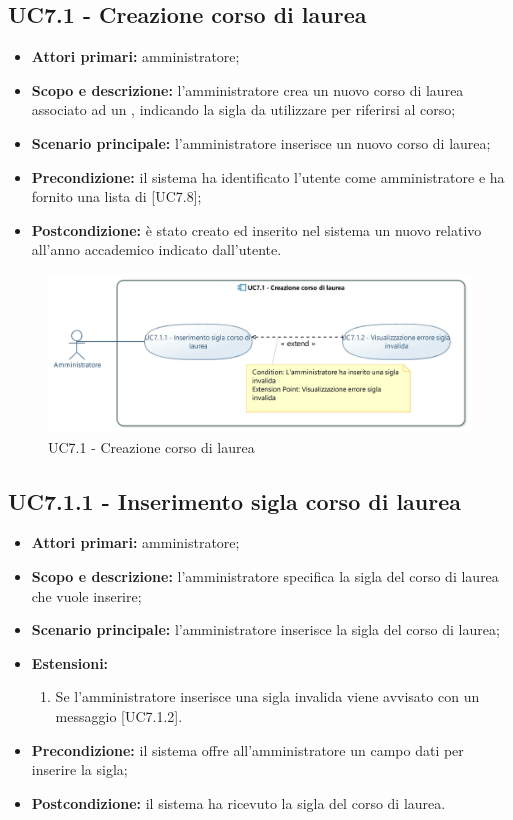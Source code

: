 \documentclass[AnalisiDeiRequisiti.tex]{subfiles}
\begin{document}
\subsection{UC7.1 - Creazione corso di laurea}
\begin{itemize}
	\item \textbf{Attori primari:} amministratore;
	\item \textbf{Scopo e descrizione:} l'amministratore crea un nuovo corso di laurea associato ad un , indicando la sigla da utilizzare per riferirsi al corso;
	\item \textbf{Scenario principale:} l'amministratore inserisce un nuovo corso di laurea;
	\item \textbf{Precondizione:} il sistema ha identificato l'utente come amministratore e ha fornito una lista di  [UC7.8];
	\item \textbf{Postcondizione:} è stato creato ed inserito nel sistema un nuovo  relativo all'anno accademico indicato dall'utente.
\end{itemize}

\begin{figure}[H]
	\centering
	\includegraphics[width=1.1\linewidth]{UC7_1.jpg}
	\caption{UC7.1 - Creazione corso di laurea}
	\label{fig:UC7.1 - Creazione corso di laurea}
\end{figure}

\subsection{UC7.1.1 - Inserimento sigla corso di laurea}
\begin{itemize}
	\item \textbf{Attori primari:} amministratore;
	\item \textbf{Scopo e descrizione:} l'amministratore specifica la sigla del corso di laurea che vuole inserire;
	\item \textbf{Scenario principale:} l'amministratore inserisce la sigla del corso di laurea;
	\item \textbf{Estensioni:}
	\begin{enumerate}
		\item Se l'amministratore inserisce una sigla invalida viene avvisato con un messaggio [UC7.1.2].
	\end{enumerate}
	\item \textbf{Precondizione:} il sistema offre all'amministratore un campo dati per inserire la sigla; 
	\item \textbf{Postcondizione:} il sistema ha ricevuto la sigla del corso di laurea.
\end{itemize}
\end{document}
